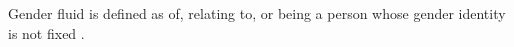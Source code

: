 Gender fluid is defined as of, relating to, or being a person whose gender 
identity is not fixed \cite{gender-fluid-def}.
